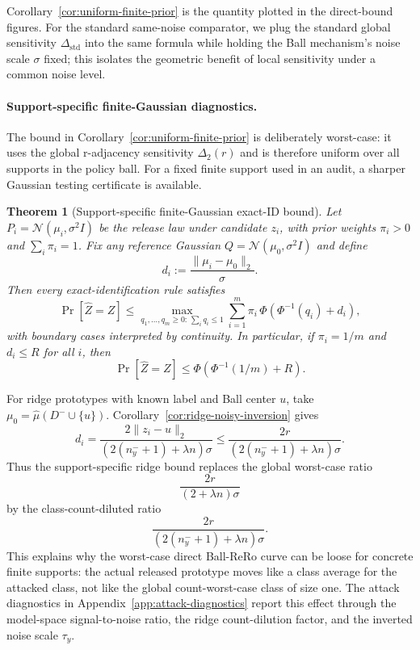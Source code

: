 \documentclass[conference,compsoc]{IEEEtran}
\newtheorem{theorem}{Theorem}
\begin{document}
Corollary~\ref{cor:uniform-finite-prior} is the quantity plotted in the direct-bound figures. For the standard same-noise comparator, we plug the standard global sensitivity $\Delta_{\mathrm{std}}$ into the same formula while holding the Ball mechanism's noise scale $\sigma$ fixed; this isolates the geometric benefit of local sensitivity under a common noise level.


\paragraph{Support-specific finite-Gaussian diagnostics.}
The bound in Corollary~\ref{cor:uniform-finite-prior} is deliberately worst-case: it uses the global r-adjacency sensitivity $\Delta_2(r)$ and is therefore uniform over all supports in the policy ball. For a fixed finite support used in an audit, a sharper Gaussian testing certificate is available.

\begin{theorem}[Support-specific finite-Gaussian exact-ID bound]
\label{thm:finite-gaussian-support-bound}
Let $P_i=\mathcal N(\mu_i,\sigma^2 I)$ be the release law under candidate $z_i$, with prior weights $\pi_i>0$ and $\sum_i\pi_i=1$. Fix any reference Gaussian $Q=\mathcal N(\mu_0,\sigma^2 I)$ and define
\[
d_i:=\frac{\|\mu_i-\mu_0\|_2}{\sigma}.
\]
Then every exact-identification rule satisfies
\[
\Pr[\widehat Z=Z]
\le
\max_{q_1,\ldots,q_m\ge 0:\,\sum_i q_i\le 1}
\sum_{i=1}^m
\pi_i\,\Phi\!\left(\Phi^{-1}(q_i)+d_i\right),
\]
with boundary cases interpreted by continuity. In particular, if $\pi_i=1/m$ and $d_i\le R$ for all $i$, then
\[
\Pr[\widehat Z=Z]
\le
\Phi\!\left(\Phi^{-1}(1/m)+R\right).
\]
\end{theorem}

For ridge prototypes with known label and Ball center $u$, take $\mu_0=\widehat\mu(D^-\cup\{u\})$. Corollary~\ref{cor:ridge-noisy-inversion} gives
\[
d_i
=\frac{2\|z_i-u\|_2}{(2(n_y^-+1)+\lambda n)\sigma}
\le
\frac{2r}{(2(n_y^-+1)+\lambda n)\sigma}.
\]
Thus the support-specific ridge bound replaces the global worst-case ratio
\[
\frac{2r}{(2+\lambda n)\sigma}
\]
by the class-count-diluted ratio
\[
\frac{2r}{(2(n_y^-+1)+\lambda n)\sigma}.
\]
This explains why the worst-case direct Ball-ReRo curve can be loose for concrete finite supports: the actual released prototype moves like a class average for the attacked class, not like the global count-worst-case class of size one. The attack diagnostics in Appendix~\ref{app:attack-diagnostics} report this effect through the model-space signal-to-noise ratio, the ridge count-dilution factor, and the inverted noise scale $\tau_y$.
\end{document}
